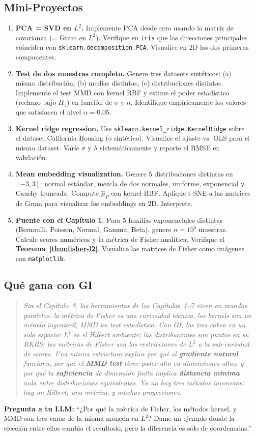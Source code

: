 \subsection*{Mini-Proyectos}
\begin{enumerate}[resume]
	\item[$\star\star\star\star$] \textbf{PCA = SVD en $L^2$.} Implemente PCA desde cero usando la matriz de covarianza (= Gram en $L^2$). Verifique en \texttt{iris} que las direcciones principales coinciden con \texttt{sklearn.decomposition.PCA}. Visualice en 2D las dos primeras componentes.
	\item[$\star\star\star\star$] \textbf{Test de dos muestras completo.} Genere tres datasets sintéticos: (a) misma distribución, (b) medias distintas, (c) distribuciones distintas. Implemente el test MMD con kernel RBF y estime el poder estadístico (rechazo bajo $H_1$) en función de $\sigma$ y $n$. Identifique empíricamente los valores que satisfacen el nivel $\alpha = 0.05$.
	\item[$\star\star\star\star$] \textbf{Kernel ridge regression.} Use \texttt{sklearn.kernel\_ridge.KernelRidge} sobre el dataset California Housing (o sintético). Visualice el ajuste vs. OLS para el mismo dataset. Varíe $\sigma$ y $\lambda$ sistemáticamente y reporte el RMSE en validación.
	\item[$\star\star\star\star$] \textbf{Mean embedding visualization.} Genere 5 distribuciones distintas en $[-3,3]$: normal estándar, mezcla de dos normales, uniforme, exponencial y Cauchy truncada. Compute $\widehat\mu_P$ con kernel RBF. Aplique t-SNE a las matrices de Gram para visualizar los embeddings en 2D. Interprete.
	\item[$\star\star\star\star$] \textbf{Puente con el Capítulo 1.} Para 5 familias exponenciales distintas (Bernoulli, Poisson, Normal, Gamma, Beta), genere $n=10^5$ muestras. Calcule scores numéricos y la métrica de Fisher analítica. Verifique el \textbf{Teorema~\ref{thm:fisher-l2}}. Visualice las matrices de Fisher como imágenes con \texttt{matplotlib}.
\end{enumerate}

\subsection*{Qué gana con GI}

\begin{quote}
	\itshape
	Sin el Capítulo~8, las herramientas de los Capítulos~1--7 viven en mundos paralelos: la métrica de Fisher es una curiosidad técnica, los kernels son un método ingenieril, MMD un test estadístico.  Con GI, las tres caben en un solo espacio: $L^2$ es el Hilbert ambiente; las distribuciones son \emph{puntos} en su RKHS; las métricas de Fisher son las restricciones de $L^2$ a la sub-variedad de scores.  Una misma estructura explica por qué el \textbf{gradiente natural} funciona, por qué el \textbf{MMD test} tiene poder alto en dimensiones altas, y por qué la \textbf{suficiencia} de dimensión finita implica \textbf{distancia mínima} nula entre distribuciones equivalentes.  Ya no hay tres métodos inconexos: hay \emph{un Hilbert, una métrica, y muchas proyecciones}.
\end{quote}

\bigskip
\noindent
\textbf{Pregunta a tu LLM:} ``¿Por qué la métrica de Fisher, los métodos kernel, y MMD son tres caras de la misma moneda en $L^2$? Dame un ejemplo donde la elección entre ellos cambia el resultado, pero la diferencia es sólo de coordenadas.''
